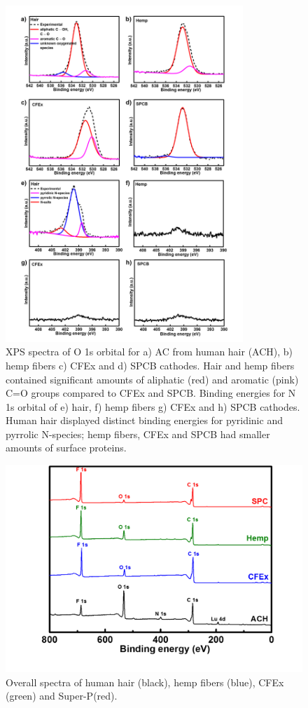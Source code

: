 \documentclass{article}
\begin{document}
\begin{figure}
  \centering
  \includegraphics[width=0.8\textwidth]{fig/XPSON}
    \caption{XPS spectra of O 1s orbital for a) AC from human hair (ACH), b) hemp fibers c) CFEx and d) SPCB cathodes. Hair and hemp fibers contained significant amounts of aliphatic (red) and aromatic (pink) C=O groups  compared to CFEx and SPCB. Binding energies for N 1s orbital of e) hair, f) hemp fibers g) CFEx and h) SPCB cathodes. Human hair displayed distinct binding energies for pyridinic and pyrrolic N-species; hemp fibers, CFEx and SPCB had smaller amounts of surface proteins.}
  \label{fig:XPSON}
\end{figure}

\begin{figure}%
\centering
\includegraphics[width=\textwidth]{fig/XPSoverall}
\caption{Overall spectra of human hair (black), hemp fibers (blue), CFEx (green) and Super-P(red).}
\label{fig:XPSoverall}
\end{figure}
\end{document}
